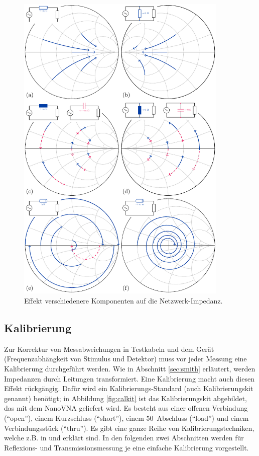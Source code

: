 \documentclass[twoside,a4paper,11pt,halfparskip,DIV=11,notitlepage]{scrartcl}
\begin{document}
\begin{figure}
    \begin{center}\includegraphics[width=0.9\textwidth]{figures/smith_big_picture/smith_big_picture.pdf}\end{center}
    \caption{Effekt verschiedenere Komponenten auf die Netzwerk-Impedanz.}
    \label{fig:smithbigpicture}
\end{figure}

\newpage %
\subsection{Kalibrierung}\label{sec:calibration}

Zur Korrektur von Messabweichungen in Testkabeln und dem Gerät
(Frequenzabhängkeit von Stimulus und Detektor) muss vor jeder Messung eine
Kalibrierung durchgeführt werden. Wie in Abschnitt \ref{sec:smith} erläutert,
werden Impedanzen durch Leitungen transformiert. Eine Kalibrierung macht
auch diesen Effekt rückgängig. Dafür wird ein Kalibrierungs-Standard
(auch Kalibrierungskit genannt) benötigt; in Abbildung \ref{fig:calkit} ist
das Kalibrierungskit abgebildet, das mit dem NanoVNA geliefert wird. Es
besteht aus einer offenen Verbindung (``open''), einem Kurzschluss (``short''),
einem 50~\Ohm Abschluss (``load'') und einem Verbindungsstück (``thru'').
Es gibt eine ganze Reihe von Kalibrierungstechniken, welche z.B. in
\cite{hiebel2007fundamentals}  und \cite{hiebel2008vector} erklärt sind. In
den folgenden zwei Abschnitten werden für Reflexions- und Transmissionsmessung
je eine einfache Kalibrierung vorgestellt.
\end{document}
